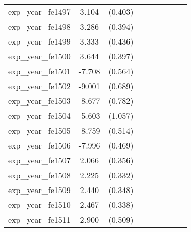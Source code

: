 {\begin{tabular}{l*{4}{cc}}
exp\_year\_fe1497&    3.104\sym{***}&  (0.403)&                  &         &                  &         &                  &         \\
exp\_year\_fe1498&    3.286\sym{***}&  (0.394)&                  &         &                  &         &                  &         \\
exp\_year\_fe1499&    3.333\sym{***}&  (0.436)&                  &         &                  &         &                  &         \\
exp\_year\_fe1500&    3.644\sym{***}&  (0.397)&                  &         &                  &         &                  &         \\
exp\_year\_fe1501&   -7.708\sym{***}&  (0.564)&                  &         &                  &         &                  &         \\
exp\_year\_fe1502&   -9.001\sym{***}&  (0.689)&                  &         &                  &         &                  &         \\
exp\_year\_fe1503&   -8.677\sym{***}&  (0.782)&                  &         &                  &         &                  &         \\
exp\_year\_fe1504&   -5.603\sym{***}&  (1.057)&                  &         &                  &         &                  &         \\
exp\_year\_fe1505&   -8.759\sym{***}&  (0.514)&                  &         &                  &         &                  &         \\
exp\_year\_fe1506&   -7.996\sym{***}&  (0.469)&                  &         &                  &         &                  &         \\
exp\_year\_fe1507&    2.066\sym{***}&  (0.356)&                  &         &                  &         &                  &         \\
exp\_year\_fe1508&    2.225\sym{***}&  (0.332)&                  &         &                  &         &                  &         \\
exp\_year\_fe1509&    2.440\sym{***}&  (0.348)&                  &         &                  &         &                  &         \\
exp\_year\_fe1510&    2.467\sym{***}&  (0.338)&                  &         &                  &         &                  &         \\
exp\_year\_fe1511&    2.900\sym{***}&  (0.509)&                  &         &                  &         &                  &         \\

\end{tabular}}
